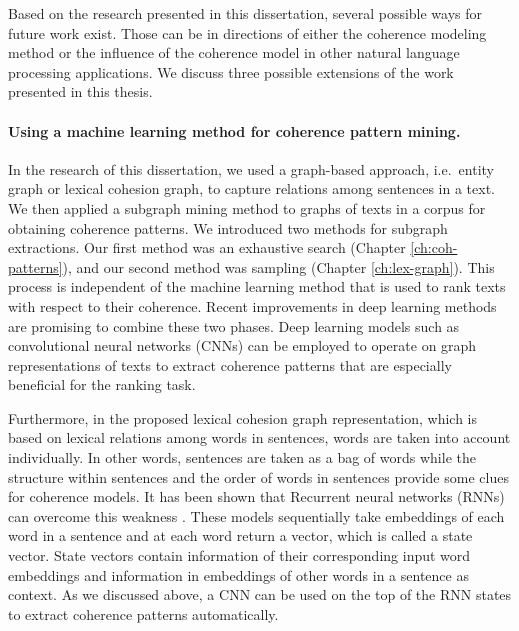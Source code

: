Based on the research presented in this dissertation, several possible ways for future work exist. 
Those can be in directions of either the coherence modeling method or the influence of the coherence model in other natural language processing applications.   
We discuss three possible extensions of the work presented in this thesis. 

\paragraph{Using a machine learning method for coherence pattern mining.} 
In the research of this dissertation, we used a graph-based approach, i.e.\ entity graph or lexical cohesion graph, to capture relations among sentences in a text. 
We then applied a subgraph mining method to graphs of texts in a corpus for obtaining coherence patterns. 
We introduced two methods for subgraph extractions.  
Our first method was an exhaustive search (Chapter \ref{ch:coh-patterns}), and our second method was sampling (Chapter \ref{ch:lex-graph}). 
This process is independent of the machine learning method that is used to rank texts with respect to their coherence. 
Recent improvements in deep learning methods are promising to combine these two phases. 
Deep learning models \cite{goldberg17} such as convolutional neural networks (CNNs) \cite{kimyoon14} can be employed to operate on graph representations of texts to extract coherence patterns that are especially beneficial for the ranking task. 

Furthermore, in the proposed lexical cohesion graph representation, which is based on lexical relations among words in sentences, words are taken into account individually. 
In other words, sentences are taken as a bag of words while the structure within sentences \cite{louis12} and the order of words in sentences provide some clues for coherence models. 
It has been shown that Recurrent neural networks (RNNs) can overcome this weakness \cite{goldberg17}. 
These models sequentially take embeddings of each word in a sentence and at each word return a vector, which is called a state vector.  
State vectors contain information of their corresponding input word embeddings and information in embeddings of other words in a sentence as context.  
As we discussed above, a CNN can be used on the top of the RNN states to extract coherence patterns automatically. 


